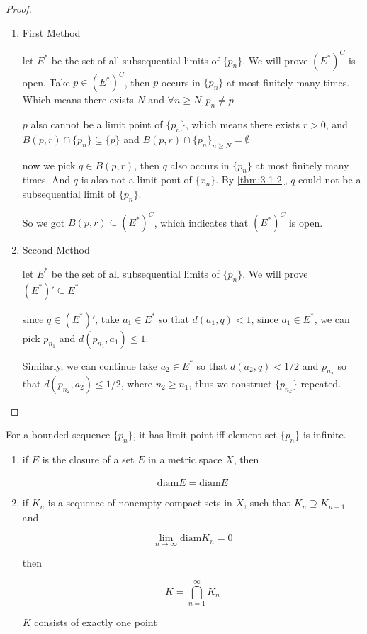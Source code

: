 \begin{proof}
    \begin{enumerate}
        \item First Method


   let $E^*$ be the set of all subsequential limits of $\{ p_n \}$. We will prove $(E^*)^C$ is open. 
   Take $p \in (E^*)^C$, then $p$ occurs in $\{ p_n\}$ at most finitely many times. Which means there exists $N$ and
   $\forall n \ge N, p_n \ne p$

   $p$ also cannot be a limit point of $\{ p_n \}$, which means there exists $r > 0$, and 
   $B(p, r) \cap \{ p_n\} \subseteq \{ p \}$ and $B(p, r) \cap \{ p_n\}_{n \ge N} = \emptyset$

   now we pick $q \in B(p,r)$, then $q$ also occurs in $\{ p_n\}$ at most finitely many times. And 
   $q$ is also not a limit pont of $\{ x_n \}$. By \autoref{thm:3-1-2}, $q$ could not be a subsequential limit of $\{ p_n \}$.

   So we got $B(p,r) \subseteq (E^*)^C$, which indicates that $(E^*)^C$ is open.

        \item Second Method

    let $E^*$ be the set of all subsequential limits of $\{ p_n \}$. We will prove $(E^*)' \subseteq E^*$

    since $q \in (E^*)'$, take $a_1 \in E^*$ so that $d(a_1, q) < 1$, since $a_1 \in E^*$, we can pick $p_{n_1}$
    and $d(p_{n_1}, a_1) \le 1$. 
    
    Similarly, we can continue take $a_2 \in E^*$ so that $d(a_2, q) < 1/2$ and $p_{n_2}$
    so that $d(p_{n_2}, a_2) \le 1/2$, where $n_2 \ge n_1$, thus we construct $\{p_{n_k}\}$ repeated.
    \end{enumerate}

\end{proof}

\begin{remark}
    For a bounded sequence $\{ p_n\}$, it has limit point iff element set $\{ p_n\}$ is infinite.
\end{remark}

\begin{thm}
    \label{thm:3-1-6}
    \begin{enumerate}
        \item if $\overline{E}$ is the closure of a set $E$ in a metric space $X$, then

        \[
            \mathrm{diam} \overline{E} = \mathrm{diam} E
        \]

        \item if $K_n$ is a sequence of nonempty compact sets in $X$, such that $K_n \supseteq K_{n+1}$ and

        \[
            \lim_{n \to \infty} \mathrm{diam} K_n = 0
        \]

        then

        \[
            K = \bigcap_{n=1}^{\infty} K_n
        \]

        $K$ consists of exactly one point
    \end{enumerate}
\end{thm}

